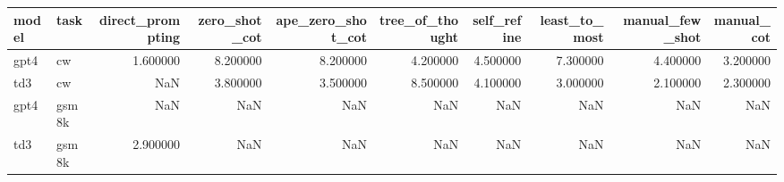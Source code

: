 \begin{tabular}{llrrrrrrrr}
\toprule
model & task & direct_prompting & zero_shot_cot & ape_zero_shot_cot & tree_of_thought & self_refine & least_to_most & manual_few_shot & manual_cot \\
\midrule
gpt4 & cw & 1.600000 & 8.200000 & 8.200000 & 4.200000 & 4.500000 & 7.300000 & 4.400000 & 3.200000 \\
td3 & cw & NaN & 3.800000 & 3.500000 & 8.500000 & 4.100000 & 3.000000 & 2.100000 & 2.300000 \\
gpt4 & gsm8k & NaN & NaN & NaN & NaN & NaN & NaN & NaN & NaN \\
td3 & gsm8k & 2.900000 & NaN & NaN & NaN & NaN & NaN & NaN & NaN \\
\bottomrule
\end{tabular}
